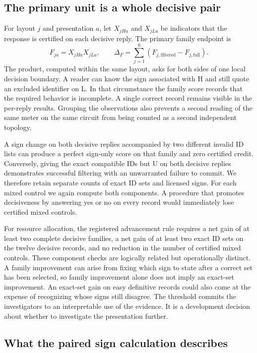 \documentclass[12pt,letterpaper]{article}
\begin{document}
\subsection{The primary unit is a whole decisive pair}

For layout $j$ and presentation $a$, let $X_{jHa}$ and $X_{jLa}$ be indicators that the response is certified on each decisive reply. The primary family endpoint is
\[
 F_{ja}=X_{jHa}X_{jLa}, \qquad
 \Delta_F=\sum_{j=1}^6(F_{j,\mathrm{filtered}}-F_{j,\mathrm{full}}).
\]
The product, computed within the same layout, asks for both sides of one local decision boundary. A reader can know the sign associated with H and still quote an excluded identifier on L. In that circumstance the family score records that the required behavior is incomplete. A single correct record remains visible in the per-reply results. Grouping the observations also prevents a second reading of the same meter on the same circuit from being counted as a second independent topology.

A sign change on both decisive replies accompanied by two different invalid ID lists can produce a perfect sign-only score on that family and zero certified credit. Conversely, giving the exact compatible IDs but U on both decisive replies demonstrates successful filtering with an unwarranted failure to commit. We therefore retain separate counts of exact ID sets and licensed signs. For each mixed control we again compute both components. A procedure that promotes decisiveness by answering yes or no on every record would immediately lose certified mixed controls.

For resource allocation, the registered advancement rule requires a net gain of at least two complete decisive families, a net gain of at least two exact ID sets on the twelve decisive records, and no reduction in the number of certified mixed controls. These component checks are logically related but operationally distinct. A family improvement can arise from fixing which sign to state after a correct set has been selected, so family improvement alone does not imply an exact-set improvement. An exact-set gain on easy definitive records could also come at the expense of recognizing whose signs still disagree. The threshold commits the investigators to an interpretable use of the evidence. It is a development decision about whether to investigate the presentation further.

\subsection{What the paired sign calculation describes}
\end{document}
